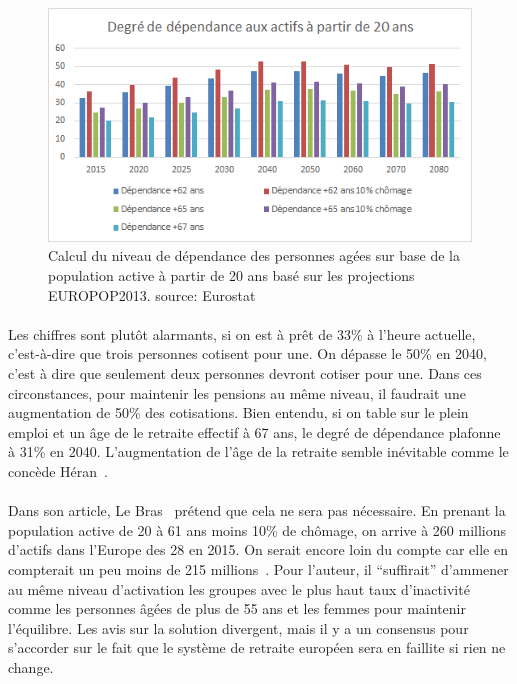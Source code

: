 \begin{figure}[h!]
    \begin{center}
        \includegraphics[scale=0.9]{document/real_dep.png}
        \caption{Calcul du niveau de dépendance des personnes agées sur base de la population active à partir de 20 ans basé sur les projections EUROPOP2013. source: Eurostat~\citep{eurostat_europop13}}
        \label{real_dep}
    \end{center}
\end{figure}

\paragraph{}Les chiffres sont plutôt alarmants, si on est à prêt de 33\% à l’heure actuelle, c’est-à-dire que trois personnes cotisent pour une. On dépasse le 50\% en 2040, c’est à dire que seulement deux personnes devront cotiser pour une. Dans ces circonstances, pour maintenir les pensions au même niveau, il faudrait une augmentation de 50\% des cotisations. Bien entendu, si on table sur le plein emploi et un âge de le retraite effectif à 67 ans, le degré de dépendance plafonne à 31\% en 2040. L’augmentation de l’âge de la retraite semble inévitable comme le concède Héran~\citep[pp.18]{heran}.

\paragraph{}Dans son article, Le Bras~\citep[pp.19-39]{heran} prétend que cela ne sera pas nécessaire. En prenant la population active de 20 à 61 ans moins 10\% de chômage, on arrive à 260 millions d’actifs dans l’Europe des 28 en 2015. On serait encore loin du compte car elle en compterait un peu moins de 215 millions~\citep[pp.36]{heran}. Pour l’auteur, il “suffirait” d'ammener au même niveau d'activation les groupes avec le plus haut taux d'inactivité comme les personnes âgées de plus de 55 ans et les femmes pour maintenir l’équilibre. Les avis sur la solution divergent, mais il y a un consensus pour s’accorder sur le fait que le système de retraite européen sera en faillite si rien ne change. 

